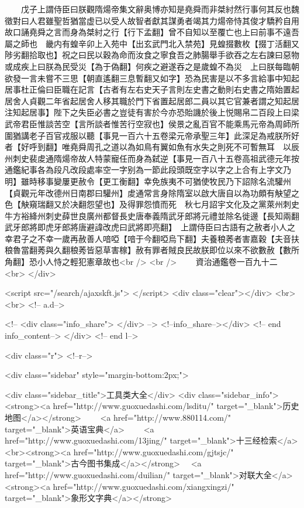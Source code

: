 　　戊子上謂侍臣曰朕觀隋煬帝集文辭奥博亦知是堯舜而非桀紂然行事何其反也魏徵對曰人君雖聖哲猶當虚已以受人故智者獻其謀勇者竭其力煬帝恃其俊才驕矜自用故口誦堯舜之言而身為桀紂之行【行下孟翻】曾不自知以至覆亡也上曰前事不遠吾屬之師也　畿内有蝗辛卯上入苑中【出玄武門北入禁苑】見蝗掇數枚【掇丁活翻又陟劣翻拾取也】祝之曰民以穀為命而汝食之寧食吾之肺腸舉手欲吞之左右諫曰惡物或成疾上曰朕為民受災【為于偽翻】何疾之避遂吞之是歲蝗不為災　上曰朕每臨朝欲發一言未嘗不三思【朝直遙翻三息暫翻又如字】恐為民害是以不多言給事中知起居事杜正倫曰臣職在記言【古者有左右史天子言則左史書之動則右史書之隋始置起居舍人貞觀二年省起居舍人移其職於門下省置起居郎二員以其它官兼者謂之知起居注知起居事】陛下之失臣必書之豈徒有害於今亦恐貽譏於後上悦賜帛二百段上曰梁武帝君臣惟談苦空【言所談者惟苦行空寂也】侯景之亂百官不能乘馬元帝為周師所圍猶講老子百官戎服以聽【事見一百六十五卷梁元帝承聖三年】此深足為戒朕所好者【好呼到翻】唯堯舜周孔之道以為如鳥有翼如魚有水失之則死不可暫無耳　以辰州刺史裴䖍通隋煬帝故人特蒙寵任而身為弑逆【事見一百八十五卷高祖武德元年按通鑑紀事各為段凡改段處率空一字别為一節此段頭既空字以字之上合有上字文乃明】雖時移事變屢更赦令【更工衡翻】幸免族夷不可猶使牧民乃下詔除名流驩州【貞觀元年改德州日南郡曰驩州】䖍通常言身除隋室以啟大唐自以為功頗有觖望之色【觖窺瑞翻又於决翻怨望也】及得罪怨憤而死　秋七月詔宇文化及之黨萊州刺史牛方裕絳州刺史薛世良廣州都督長史唐奉義隋武牙郎將元禮並除名徙邊【長知兩翻武牙郎將即虎牙郎將唐避諱改虎曰武將即亮翻】　上謂侍臣曰古語有之赦者小人之幸君子之不幸一歲再赦善人喑啞【喑于今翻啞烏下翻】夫養稂莠者害嘉穀【夫音扶稂魯當翻莠與久翻稂莠皆惡草害稼】赦有罪者賊良民故朕即位以來不欲數赦【數所角翻】恐小人恃之輕犯憲章故也<br />
<br />
　　資治通鑑卷一百九十二  <br>
   </div> 

<script src="/search/ajaxskft.js"> </script>
 <div class="clear"></div>
<br>
<br>
 <!-- a.d-->

 <!--
<div class="info_share">
</div> 
-->
 <!--info_share--></div>   <!-- end info_content-->
  </div> <!-- end l-->

<div class="r">   <!--r-->



<div class="sidebar"  style="margin-bottom:2px;">

 
<div class="sidebar_title">工具类大全</div>
<div class="sidebar_info">
<strong><a href="http://www.guoxuedashi.com/lsditu/" target="_blank">历史地图</a></strong>　　
<a href="http://www.880114.com/" target="_blank">英语宝典</a>　　
<a href="http://www.guoxuedashi.com/13jing/" target="_blank">十三经检索</a>　
<br><strong><a href="http://www.guoxuedashi.com/gjtsjc/" target="_blank">古今图书集成</a></strong>　
<a href="http://www.guoxuedashi.com/duilian/" target="_blank">对联大全</a>　<strong><a href="http://www.guoxuedashi.com/xiangxingzi/" target="_blank">象形文字典</a></strong>　

